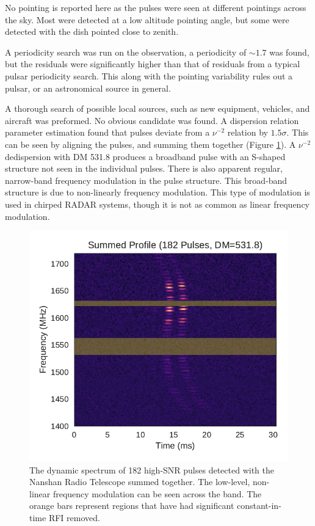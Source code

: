 \documentclass[a4paper,fleqn,usenatbib]{mnras}
\begin{document}
No pointing is reported here as the pulses were seen at different pointings
across the sky. Most were detected at a low altitude pointing angle, but some
were detected with the dish pointed close to zenith.

A periodicity search was run on the observation, a periodicity of $\sim 1.7$ was
found, but the residuals were significantly higher than that of residuals from a
typical pulsar periodicity search. This along with the pointing variability
rules out a pulsar, or an astronomical source in general.

A thorough search of possible local sources, such as new equipment, vehicles,
and aircraft was preformed. No obvious candidate was found. A dispersion
relation parameter estimation found that pulses deviate from a $\nu^{-2}$
relation by $1.5 \sigma$. This can be seen by aligning the pulses, and summing
them together (Figure \ref{fig:xao_summed}). A $\nu^{-2}$ dedispersion with DM
531.8 produces a broadband pulse with an S-shaped structure not seen in the
individual pulses. There is also apparent regular, narrow-band frequency
modulation in the pulse structure. This broad-band structure is due to
non-linearly frequency modulation. This type of modulation is used in chirped
RADAR systems, though it is not as common as linear frequency modulation.

\begin{figure}
    \includegraphics[width=1.0\linewidth]{figures/XAO_summed_dynamic.pdf}
    \caption{The dynamic spectrum of 182 high-SNR pulses detected with the
    Nanshan Radio Telescope summed together.  The low-level, non-linear
    frequency modulation can be seen across the band. The orange bars represent
    regions that have had significant constant-in-time RFI removed.
    }
    \label{fig:xao_summed}
\end{figure}
\end{document}
